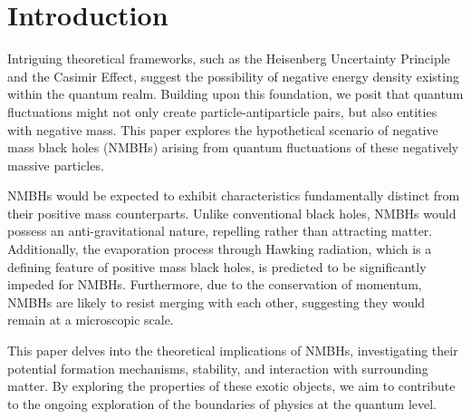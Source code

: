 \section{Introduction}
Intriguing theoretical frameworks, 
such as the Heisenberg Uncertainty Principle and the Casimir Effect, 
suggest the possibility of negative energy density existing within the quantum realm. 
Building upon this foundation, we posit that quantum fluctuations might not only create particle-antiparticle pairs, 
but also entities with negative mass. 
This paper explores the hypothetical scenario of negative mass black holes (NMBHs) arising from quantum fluctuations of 
these negatively massive particles.

NMBHs would be expected to exhibit characteristics fundamentally distinct from their positive mass counterparts. 
Unlike conventional black holes, NMBHs would possess an anti-gravitational nature, 
repelling rather than attracting matter. Additionally, the evaporation process through Hawking radiation, 
which is a defining feature of positive mass black holes, is predicted to be significantly impeded for NMBHs. 
Furthermore, due to the conservation of momentum, NMBHs are likely to resist merging with each other, 
suggesting they would remain at a microscopic scale.

This paper delves into the theoretical implications of NMBHs, 
investigating their potential formation mechanisms, stability, 
and interaction with surrounding matter. 
By exploring the properties of these exotic objects, 
we aim to contribute to the ongoing exploration of the boundaries of physics at the quantum level.